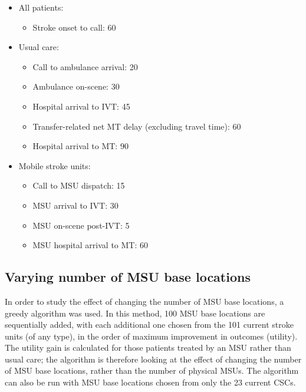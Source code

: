 \begin{minipage}{1.0\textwidth}  %
\begin{spacing}{1.2}
\begin{itemize}
    \item All patients:
    \begin{itemize}
        \item Stroke onset to call: 60
    \end{itemize}
    \item Usual care:
    \begin{itemize}
        \item Call to ambulance arrival: 20
        \item Ambulance on-scene: 30
        \item Hospital arrival to IVT: 45
        \item Transfer-related net MT delay (excluding travel time): 60
        \item Hospital arrival to MT: 90
    \end{itemize}
    \item Mobile stroke units:
    \begin{itemize}
        \item Call to MSU dispatch: 15
        \item MSU arrival to IVT: 30
        \item MSU on-scene post-IVT: 5
        \item MSU hospital arrival to MT: 60
    \end{itemize}
\end{itemize}
\end{spacing}
\end{minipage}


\subsection{Varying number of MSU base locations}

In order to study the effect of changing the number of MSU base locations, a greedy algorithm was used. In this method, 100 MSU base locations are sequentially added, with each additional one chosen from the 101 current stroke units (of any type), in the order of maximum improvement in outcomes (utility). The utility gain is calculated for those patients treated by an MSU rather than usual care; the algorithm is therefore looking at the effect of changing the number of MSU base locations, rather than the number of physical MSUs. The algorithm can also be run with MSU base locations chosen from only the 23 current CSCs.